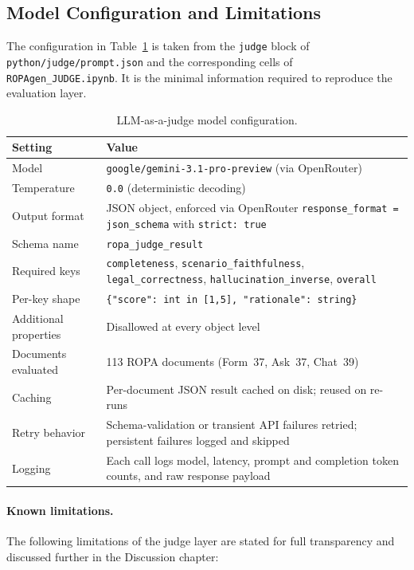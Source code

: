 \subsection{Model Configuration and Limitations}
\label{app:judge-config}

The configuration in Table~\ref{tab:judge-config} is taken from the \texttt{judge} block of \texttt{python/judge/prompt.\-json} and the corresponding cells of \texttt{ROPAgen\_JUDGE.ipynb}. It is the minimal information required to reproduce the evaluation layer.

\begin{table}[htbp]
\centering
\small
\begin{tabularx}{\textwidth}{lX}
\toprule
\textbf{Setting} & \textbf{Value} \\
\midrule
Model & \texttt{google/gemini-3.1-pro-preview} (via OpenRouter) \\
Temperature & \texttt{0.0} (deterministic decoding) \\
Output format & JSON object, enforced via OpenRouter \texttt{response\_format = json\_schema} with \texttt{strict: true} \\
Schema name & \texttt{ropa\_judge\_result} \\
Required keys & \texttt{completeness}, \texttt{scenario\_faithfulness}, \texttt{legal\_correctness}, \texttt{hallucination\_inverse}, \texttt{overall} \\
Per-key shape & \texttt{\{"score": int in [1,5], "rationale": string\}} \\
Additional properties & Disallowed at every object level \\
Documents evaluated & 113 ROPA documents (Form~37, Ask~37, Chat~39) \\
Caching & Per-document JSON result cached on disk; reused on re-runs \\
Retry behavior & Schema-validation or transient API failures retried; persistent failures logged and skipped \\
Logging & Each call logs model, latency, prompt and completion token counts, and raw response payload \\
\bottomrule
\end{tabularx}
\caption{LLM-as-a-judge model configuration.}
\label{tab:judge-config}
\end{table}

\paragraph{Known limitations.} The following limitations of the judge layer are stated for full transparency and discussed further in the Discussion chapter:

